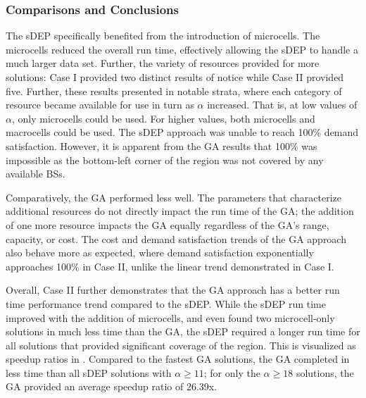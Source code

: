 \documentclass[12pt,dvipsnames]{report}
\begin{document}
\subsubsection{Comparisons and Conclusions}

The sDEP specifically benefited from the introduction of microcells.  The microcells reduced the overall run time, effectively allowing the sDEP to handle a much larger data set.  Further, the variety of resources provided for more solutions: Case I provided two distinct results of notice while Case II provided five.  Further, these results presented in notable strata, where each category of resource became available for use in turn as $\alpha$ increased.  That is, at low values of $\alpha$, only microcells could be used.  For higher values, both microcells and macrocells could be used.  The sDEP approach was unable to reach 100\% demand satisfaction.  However, it is apparent from the GA results that 100\% was impossible as the bottom-left corner of the region was not covered by any available BSs.

Comparatively, the GA performed less well.  The parameters that characterize additional resources do not directly impact the run time of the GA; the addition of one more resource impacts the GA equally regardless of the GA's range, capacity, or cost.  The cost and demand satisfaction trends of the GA approach also behave more as expected, where demand satisfaction exponentially approaches 100\% in Case II, unlike the linear trend demonstrated in Case I.

Overall, Case II further demonstrates that the GA approach has a better run time performance trend compared to the sDEP.  While the sDEP run time improved with the addition of microcells, and even found two microcell-only solutions in much less time than the GA, the sDEP required a longer run time for all solutions that provided significant coverage of the region.  This is visualized as speedup ratios in .  Compared to the fastest GA solutions, the GA completed in less time than all sDEP solutions with $\alpha \geq 11$; for only the $\alpha \geq 18$ solutions, the GA provided an average speedup ratio of 26.39x.  
\end{document}
